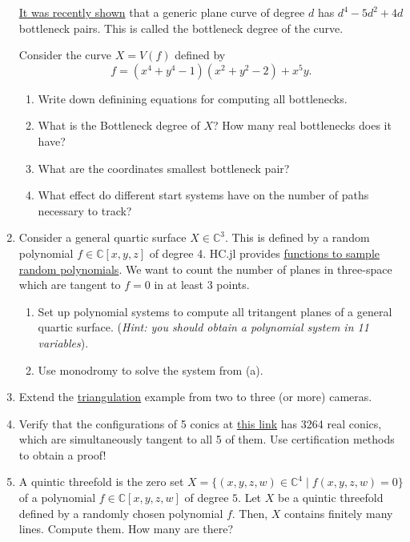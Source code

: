 \documentclass[11pt,reqno]{amsart}
\theoremstyle{definition}
\theoremstyle{remark}
\numberwithin{equation}{section}
\begin{document}
\begin{enumerate}
\href{https://arxiv.org/abs/1904.04502}{It was recently shown} that a generic plane curve of degree $d$ has $d^4-5d^2 +4d$ bottleneck pairs. This is called the {bottleneck degree} of the curve.


Consider the curve $X=V(f)$ defined by
$$f=(x^4 + y^4 - 1)(x^2 + y^2 - 2) + x^5y.$$
\begin{enumerate}
\item Write down definining equations for computing all bottlenecks.

\item What is the Bottleneck degree of $X$? How many real bottlenecks does it have?

\item What are the coordinates smallest bottleneck pair?

\item What effect do different start systems have on the number of paths necessary to track?
\end{enumerate}

\item Consider a general quartic surface $X\in\mathbb C^3$.  This is defined by a random polynomial $f\in \mathbb{C}[x,y,z]$ of degree 4. HC.jl provides  \href{https://www.juliahomotopycontinuation.org/HomotopyContinuation.jl/stable/model_kit/}{functions to sample random polynomials}. We want to count the number of planes in three-space which are tangent to $f=0$ in at least 3 points.
\begin{enumerate}
\item Set up polynomial systems to compute all tritangent planes of a general quartic surface. (\textit{Hint: you should obtain a polynomial system in 11 variables}).
\item Use monodromy to solve the system from (a).
\end{enumerate}

\item Extend the \href{https://www.juliahomotopycontinuation.org/examples/computer-vision/}{triangulation} example from two to three (or more) cameras.

\item Verify that the configurations of 5 conics at \href{https://www.juliahomotopycontinuation.org/examples/3264/}{this link} has 3264 real conics, which are simultaneously tangent to all 5 of them. Use certification methods to obtain a proof!

\item A quintic threefold is the zero set $X=\{(x,y,z,w)\in\mathbb C^4\mid f(x,y,z,w)=0\}$ of a polynomial $f\in\mathbb C[x,y,z,w]$ of degree $5$. Let $X$ be a quintic threefold defined by a randomly chosen polynomial $f$. Then, $X$ contains finitely many lines. Compute them. How many are there?


\end{enumerate}
\end{document}
